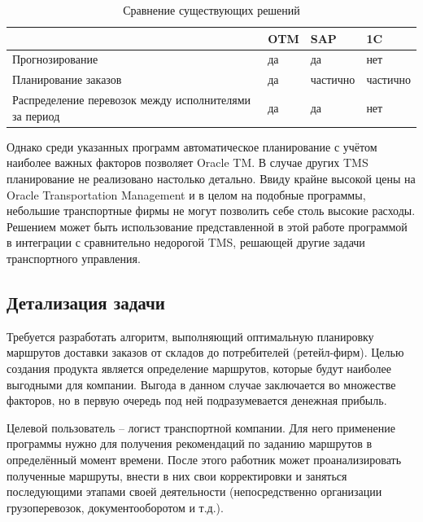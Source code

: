 	\begin{table}[h]
		\begin{center}
			\caption{Сравнение существующих решений}
			\label{cmp_table}
			\begin{tabular}{| p{5cm} | p{2.5cm} | p{2.5cm} | p{2.5cm} |}
				\hline
				\backslashbox{\textbf{Функция}}{\textbf{TMS}} &
				OTM &
				SAP &
				1C \\
				
				\hline
				Прогнозирование & 
				да &
				да &
				нет \\
				 
				\hline
				Планирование заказов &
				да &
				частично &
				частично \\
				
				\hline
				Распределение перевозок между исполнителями за период &
				да &
				да &
				нет \\
				
				\hline
			\end{tabular}
		\end{center}
	\end{table}
	
	Однако среди указанных программ автоматическое планирование с учётом наиболее важных факторов позволяет Oracle TM. В случае других TMS планирование не реализовано настолько детально. Ввиду крайне высокой цены\cite{subj:tms_cmp} на Oracle Transportation Management и в целом на подобные программы, небольшие транспортные фирмы не могут позволить себе столь высокие расходы. Решением может быть использование представленной в этой работе программой в интеграции с сравнительно недорогой TMS, решающей другие задачи транспортного управления.
	

\subsection{Детализация задачи}
	Требуется разработать алгоритм, выполняющий оптимальную планировку маршрутов доставки заказов от складов до потребителей (ретейл-фирм). Целью создания продукта является определение маршрутов, которые будут наиболее выгодными для компании. Выгода в данном случае заключается во множестве факторов, но в первую очередь под ней подразумевается денежная прибыль.
	
	Целевой пользователь -- логист транспортной компании. Для него применение программы нужно для получения рекомендаций по заданию маршрутов в определённый момент времени. После этого работник может проанализировать полученные маршруты, внести в них свои корректировки и заняться последующими этапами своей деятельности (непосредственно организации грузоперевозок, документооборотом и т.д.).
	
